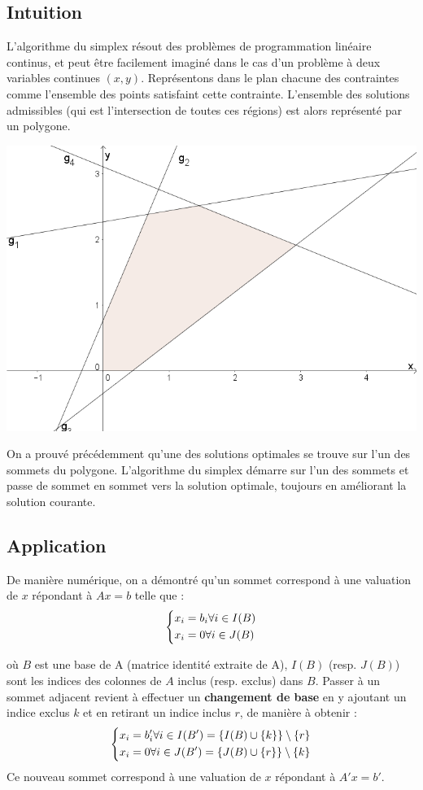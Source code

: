 \documentclass[a4paper]{report}
\theoremstyle{definition}
\theoremstyle{remark}
\theoremstyle{plain}
\begin{document}
\subsection{Intuition}
L'algorithme du simplex résout des problèmes de programmation linéaire continus,
et peut être facilement imaginé dans le cas d'un problème à deux variables
continues \((x,y)\). Représentons dans le plan chacune des contraintes comme
l'ensemble des points satisfaint cette contrainte. L'ensemble des solutions
admissibles (qui est l'intersection de toutes ces régions) est alors représenté
par un polygone.
\begin{center}\textbf{\textbf{}}
\includegraphics[width=\textwidth]{simplex-xy.png}
\end{center}
On a prouvé précédemment qu'une des solutions optimales se trouve sur l'un des
sommets du polygone. L'algorithme du simplex démarre sur l'un des sommets et
passe de sommet en sommet vers la solution optimale, toujours en améliorant la
solution courante.

\subsection{Application}

De manière numérique, on a démontré qu'un sommet correspond à une valuation de $x$ répondant à $Ax = b$ telle que :
\[\begin{dcases}
	x_i = b_i\forall i \in I(B) \\
	x_i = 0 \forall i \in J(B)
\end{dcases}\]

où $B$ est une base de A (matrice identité extraite de A), $I(B)$ (resp. $J(B)$) sont les indices des colonnes de $A$ inclus (resp. exclus) dans $B$. Passer à un sommet adjacent revient à effectuer un \textbf{changement de base} en y ajoutant un indice exclus $k$ et en retirant un indice inclus $r$, de manière à obtenir :
\[\begin{dcases}
	x_i = b'_i\forall i \in I(B') = \{ I(B) \cup \{k\} \} \setminus \{r\} \\
	x_i = 0 \forall i \in J(B') = \{ J(B) \cup \{r\} \} \setminus \{k\}
\end{dcases}\]
Ce nouveau sommet correspond à une valuation de $x$ répondant à $A'x = b'$.
\end{document}
